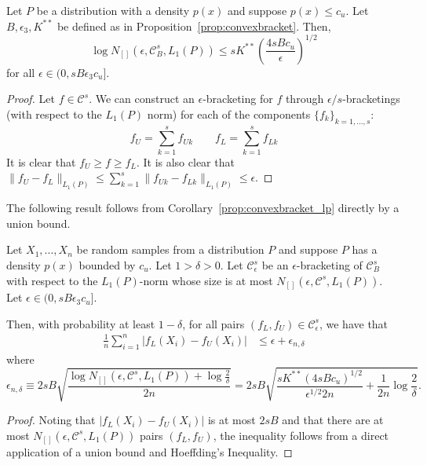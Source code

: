 \begin{corollary}
\label{cor:convexadditive_lp}
Let $P$ be a distribution with a density $p(x)$ and suppose $p(x) \leq c_u$. Let $B, \epsilon_3, K^{**}$ be defined as in Proposition~\ref{prop:convexbracket}. Then,
\[
\log N_{[]}(\epsilon, \mathcal{C}^s_B, L_1(P)) \leq s K^{**} 
    \left( \frac{4sBc_u}{\epsilon} \right)^{1/2}
\]
for all $\epsilon \in (0, s B \epsilon_3c_u]$.
\end{corollary}

\begin{proof}
Let $f \in \mathcal{C}^s$. We can construct an $\epsilon$-bracketing for $f$ through $\epsilon/s$-bracketings (with respect to the $L_1(P)$ norm) for each of the components $\{ f_k \}_{k=1,...,s}$:
\[f_U = \sum_{k=1}^s f_{Uk}  \qquad f_L = \sum_{k=1}^s f_{Lk} \]
It is clear that $f_U \geq f \geq f_L$. It is also clear that $\| f_U - f_L \|_{L_1(P)} \leq \sum_{k=1}^s \| f_{Uk} - f_{Lk} \|_{L_1(P)} \leq \epsilon$.
\end{proof}


The following result follows from Corollary~\ref{prop:convexbracket_lp} directly by a union bound. 

\begin{corollary}
\label{cor:convexbracket_ln}
Let $X_1,...,X_n$ be random samples from a distribution $P$ and suppose $P$ has a density $p(x)$ bounded by $c_u$. Let $1 > \delta > 0$. Let $\mathcal{C}^s_\epsilon$ be an $\epsilon$-bracketing of $\mathcal{C}^s_B$ with respect to the $L_1(P)$-norm whose size is at most $N_{[]}(\epsilon, \mathcal{C}^s, L_1(P))$. Let $\epsilon \in (0, s B \epsilon_3c_u]$.

Then, with probability at least $1-\delta$, for all pairs $(f_L, f_U) \in \mathcal{C}^s_\epsilon$, we have that
\begin{align*}
\frac{1}{n} \sum_{i=1}^n |f_L(X_i) - f_U(X_i)| &\leq \epsilon + \epsilon_{n, \delta}
\end{align*}
where 
$$\epsilon_{n,\delta} \equiv 
2sB \sqrt{ \frac{ \log N_{[]}(\epsilon, \mathcal{C}^s, L_1(P)) + \log \frac{2}{\delta}}{2n}} 
= 2sB \sqrt{ \frac{ sK^{**}(4sBc_u)^{1/2}}{\epsilon^{1/2} 2n} + \frac{1}{2n} \log \frac{2}{\delta}}.$$
\end{corollary}

\begin{proof}
Noting that $|f_L(X_i) - f_U(X_i)|$ is at most $2sB$ and that there are at most 
$N_{[]}(\epsilon, \mathcal{C}^s, L_1(P))$ pairs $(f_L, f_U)$, the
inequality follows from a direct application of a union bound and Hoeffding's Inequality.
\end{proof}

